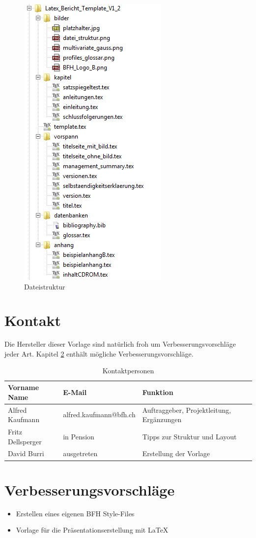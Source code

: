 \begin{figure}[H]
	\centering
		\includegraphics[scale=0.85]{bilder/datei_struktur.png}
	\caption{Dateistruktur}
	\label{fig:datei_struktur}
\end{figure}

\section{Kontakt}
\label{sec:einleitung_kontakt}

Die Hersteller dieser Vorlage sind natürlich froh um Verbesserungsvorschläge jeder Art. Kapitel \ref{sec:einleitung_vorschlaege} enthält mögliche Verbesserungsvorschläge.

\begin{table}[H]
	\centering
		\begin{tabular}{lll} \toprule
			\textbf{Vorname Name} & \textbf{E-Mail} & \textbf{Funktion} \\ \midrule
			Alfred Kaufmann & alfred.kaufmann@bfh.ch & Auftraggeber, Projektleitung, Ergänzungen \\ \midrule
			Fritz Dellsperger & in Pension & Tipps zur Struktur und Layout \\ \midrule
			David Burri & ausgetreten & Erstellung der Vorlage \\ \bottomrule
		\end{tabular}
	\caption{Kontaktpersonen}
	\label{tab:kontaktpersonen}
\end{table}


\section{Verbesserungsvorschläge}
\label{sec:einleitung_vorschlaege}

\begin{itemize}
	\item Erstellen eines eigenen BFH Style-Files
	\item Vorlage für die Präsentationserstellung mit \LaTeX{}
\end{itemize}


